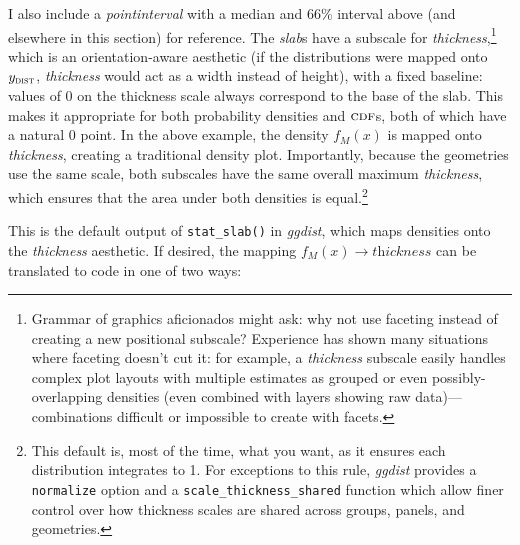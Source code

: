 \documentclass[journal]{vgtc}                     %
\begin{document}
I also include a \textit{pointinterval} with a median and 66\% interval above (and elsewhere in this section) for reference. The \textit{slab}s have a subscale for \textit{thickness},\footnote{Grammar of graphics aficionados might ask: why not use faceting instead of creating a new positional subscale? Experience has shown many situations where faceting doesn't cut it: for example, a \textit{thickness} subscale easily handles complex plot layouts with multiple estimates as grouped or even possibly-overlapping densities (even combined with layers showing raw data)---combinations difficult or impossible to create with facets.
} which is an orientation-aware aesthetic (if the distributions were mapped onto $y_\textsc{dist}$, \textit{thickness} would act as a width instead of height), with a fixed baseline: values of 0 on the thickness scale always correspond to the base of the slab. This makes it appropriate for both probability densities and $\textsc{cdf}$s, both of which have a natural 0 point. In the above example, the density $f_M(x)$ is mapped onto \textit{thickness}, creating a traditional density plot. Importantly, because the geometries use the same scale, both subscales have the same overall maximum \textit{thickness}, which ensures that the area under both densities is equal.\footnote{This default is, most of the time, what you want, as it ensures each distribution integrates to 1. For exceptions to this rule, \textit{ggdist} provides a \texttt{normalize} option and a \texttt{scale\_thickness\_shared} function which allow finer control over how thickness scales are shared across groups, panels, and geometries.} 

This is the default output of \texttt{stat\_slab()} in \textit{ggdist}, which maps densities onto the \textit{thickness} aesthetic. If desired, the mapping $f_M(x) \rightarrow \textit{thickness}$ can be translated to code in one of two ways:
\end{document}
